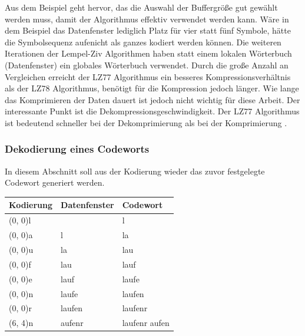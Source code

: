 Aus dem Beispiel geht hervor, das die Auswahl der Buffergröße gut gewählt werden muss, damit der Algorithmus effektiv verwendet werden kann.
Wäre in dem Beispiel das Datenfenster lediglich Platz für vier statt fünf Symbole, hätte die Symbolsequenz \glqq aufe\grqq nicht als ganzes kodiert werden können.
Die weiteren Iterationen der Lempel-Ziv Algorithmen haben statt einem lokalen Wörterbuch (Datenfenster) ein globales Wörterbuch verwendet.
Durch die große Anzahl an Vergleichen erreicht der LZ77 Algorithmus ein besseres Kompressionsverhältnis als der LZ78 Algorithmus, benötigt für die Kompression jedoch länger.
Wie lange das Komprimieren der Daten dauert ist jedoch nicht wichtig für diese Arbeit.
Der interessante Punkt ist die Dekompressionsgeschwindigkeit.
Der LZ77 Algorithmus ist bedeutend schneller bei der Dekomprimierung als bei der Komprimierung \cite{Choudhary2015}.

\subsubsection{Dekodierung eines Codeworts}
\label{subsubsec:dekodierung_codewort}
In diesem Abschnitt soll aus der Kodierung wieder das zuvor festgelegte Codewort generiert werden.
\begin{table}[]
\centering
\begin{tabular}{|l|l|l|}
\hline
\textbf{Kodierung} & \textbf{Datenfenster}         & \textbf{Codewort} \\ \hline
(0, 0)l            &                               & l                 \\ \hline
(0, 0)a            & l                             & la                \\ \hline
(0, 0)u            & la                            & lau               \\ \hline
(0, 0)f            & lau                           & lauf              \\ \hline
(0, 0)e            & lauf                          & laufe             \\ \hline
(0, 0)n            & laufe                         & laufen            \\ \hline
(0, 0)r            & laufen                        & laufenr           \\ \hline
{\color[HTML]{009901}(6, 4)n}            & {\color[HTML]{009901} aufe}nr & laufenr{\color[HTML]{009901} aufen}      \\ \hline
\end{tabular}
\end{table}

